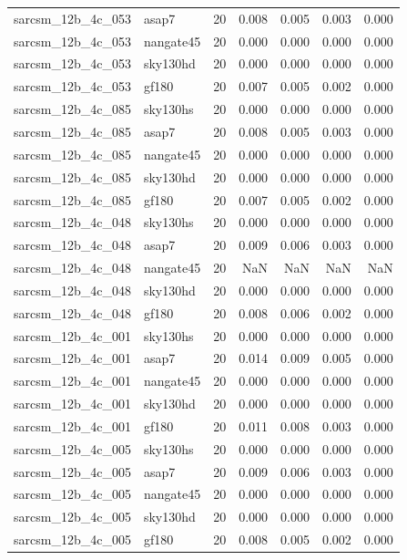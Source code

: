 \begin{tabular}{llrrrrr}
sarcsm\_12b\_4c\_053 & asap7 & 20 & 0.008 & 0.005 & 0.003 & 0.000 \\
sarcsm\_12b\_4c\_053 & nangate45 & 20 & 0.000 & 0.000 & 0.000 & 0.000 \\
sarcsm\_12b\_4c\_053 & sky130hd & 20 & 0.000 & 0.000 & 0.000 & 0.000 \\
sarcsm\_12b\_4c\_053 & gf180 & 20 & 0.007 & 0.005 & 0.002 & 0.000 \\
sarcsm\_12b\_4c\_085 & sky130hs & 20 & 0.000 & 0.000 & 0.000 & 0.000 \\
sarcsm\_12b\_4c\_085 & asap7 & 20 & 0.008 & 0.005 & 0.003 & 0.000 \\
sarcsm\_12b\_4c\_085 & nangate45 & 20 & 0.000 & 0.000 & 0.000 & 0.000 \\
sarcsm\_12b\_4c\_085 & sky130hd & 20 & 0.000 & 0.000 & 0.000 & 0.000 \\
sarcsm\_12b\_4c\_085 & gf180 & 20 & 0.007 & 0.005 & 0.002 & 0.000 \\
sarcsm\_12b\_4c\_048 & sky130hs & 20 & 0.000 & 0.000 & 0.000 & 0.000 \\
sarcsm\_12b\_4c\_048 & asap7 & 20 & 0.009 & 0.006 & 0.003 & 0.000 \\
sarcsm\_12b\_4c\_048 & nangate45 & 20 & NaN & NaN & NaN & NaN \\
sarcsm\_12b\_4c\_048 & sky130hd & 20 & 0.000 & 0.000 & 0.000 & 0.000 \\
sarcsm\_12b\_4c\_048 & gf180 & 20 & 0.008 & 0.006 & 0.002 & 0.000 \\
sarcsm\_12b\_4c\_001 & sky130hs & 20 & 0.000 & 0.000 & 0.000 & 0.000 \\
sarcsm\_12b\_4c\_001 & asap7 & 20 & 0.014 & 0.009 & 0.005 & 0.000 \\
sarcsm\_12b\_4c\_001 & nangate45 & 20 & 0.000 & 0.000 & 0.000 & 0.000 \\
sarcsm\_12b\_4c\_001 & sky130hd & 20 & 0.000 & 0.000 & 0.000 & 0.000 \\
sarcsm\_12b\_4c\_001 & gf180 & 20 & 0.011 & 0.008 & 0.003 & 0.000 \\
sarcsm\_12b\_4c\_005 & sky130hs & 20 & 0.000 & 0.000 & 0.000 & 0.000 \\
sarcsm\_12b\_4c\_005 & asap7 & 20 & 0.009 & 0.006 & 0.003 & 0.000 \\
sarcsm\_12b\_4c\_005 & nangate45 & 20 & 0.000 & 0.000 & 0.000 & 0.000 \\
sarcsm\_12b\_4c\_005 & sky130hd & 20 & 0.000 & 0.000 & 0.000 & 0.000 \\
sarcsm\_12b\_4c\_005 & gf180 & 20 & 0.008 & 0.005 & 0.002 & 0.000 \\

\end{tabular}
